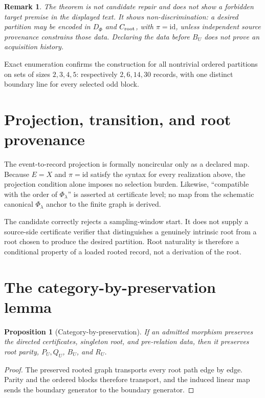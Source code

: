 \documentclass[11pt]{article}
\newtheorem{proposition}{Proposition}
\newtheorem{remark}{Remark}
\begin{document}
\begin{remark}
The theorem is not candidate repair and does not show a forbidden target
premise in the displayed text. It shows non-discrimination: a desired
partition may be encoded in \(D_\Phi\) and \(C_{\rm root}\), with
\(\pi=\mathrm{id}\), unless independent source provenance constrains those
data. Declaring the data before \(B_U\) does not prove an acquisition history.
\end{remark}

Exact enumeration confirms the construction for all nontrivial ordered
partitions on sets of sizes \(2,3,4,5\): respectively \(2,6,14,30\) records,
with one distinct boundary line for every selected odd block.

\section{Projection, transition, and root provenance}

The event-to-record projection is formally noncircular only as a declared map.
Because \(E=X\) and \(\pi=\mathrm{id}\) satisfy the syntax for every realization
above, the projection condition alone imposes no selection burden. Likewise,
``compatible with the order of \(\Phi_\lambda\)'' is asserted at certificate
level; no map from the schematic canonical \(\Phi_\lambda\) anchor to the
finite graph is derived.

The candidate correctly rejects a sampling-window start. It does not supply a
source-side certificate verifier that distinguishes a genuinely intrinsic
root from a root chosen to produce the desired partition. Root naturality is
therefore a conditional property of a loaded rooted record, not a derivation
of the root.

\section{The category-by-preservation lemma}

\begin{proposition}[Category-by-preservation]
If an admitted morphism preserves the directed certificates, singleton root,
and pre-relation data, then it preserves root parity, \(P_U,Q_U\), \(B_U\),
and \(R_U\).
\end{proposition}

\begin{proof}
The preserved rooted graph transports every root path edge by edge. Parity
and the ordered blocks therefore transport, and the induced linear map sends
the boundary generator to the boundary generator.
\end{proof}
\end{document}
